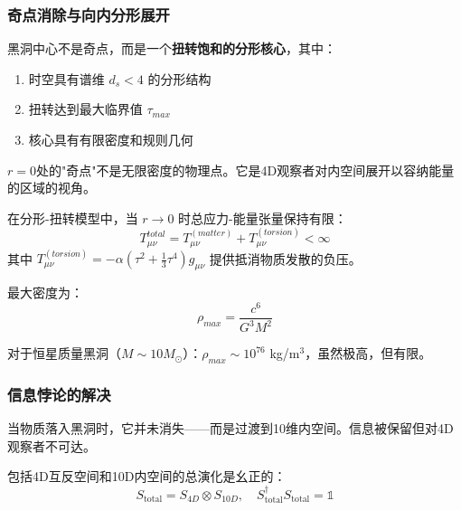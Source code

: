 \subsubsection{奇点消除与向内分形展开}

\begin{hypothesis}[扭转饱和核心]
黑洞中心不是奇点，而是一个\textbf{扭转饱和的分形核心}，其中：
\begin{enumerate}
    \item 时空具有谱维 $d_s < 4$ 的分形结构
    \item 扭转达到最大临界值 $\tau_{max}$
    \item 核心具有有限密度和规则几何
\end{enumerate}
\end{hypothesis}

\begin{insight}[奇点是视角效应]
$r = 0$处的"奇点"不是无限密度的物理点。它是4D观察者对内空间展开以容纳能量的区域的视角。
\end{insight}

\begin{theorem}[规则核心定理]
在分形-扭转模型中，当 $r \to 0$ 时总应力-能量张量保持有限：
\begin{equation}
T^{total}_{\mu\nu} = T^{(matter)}_{\mu\nu} + T^{(torsion)}_{\mu\nu} < \infty
\end{equation}
其中 $T^{(torsion)}_{\mu\nu} = -\alpha(\tau^2 + \frac{1}{3}\tau^4)g_{\mu\nu}$ 提供抵消物质发散的负压。
\end{theorem}

最大密度为：
\begin{equation}
\rho_{max} = \frac{c^6}{G^3M^2}
\end{equation}

对于恒星质量黑洞（$M \sim 10M_\odot$）：$\rho_{max} \sim 10^{76}$ kg/m$^3$，虽然极高，但有限。

\subsubsection{信息悖论的解决}

\begin{insight}[信息流向内空间]
当物质落入黑洞时，它并未消失——而是过渡到10维内空间。信息被保留但对4D观察者不可达。
\end{insight}

\begin{theorem}[CTUFT中的幺正演化]
包括4D互反空间和10D内空间的总演化是幺正的：
\begin{equation}
S_{\text{total}} = S_{4D} \otimes S_{10D}, \quad S_{\text{total}}^\dagger S_{\text{total}} = \mathbb{1}
\end{equation}
\end{theorem}

